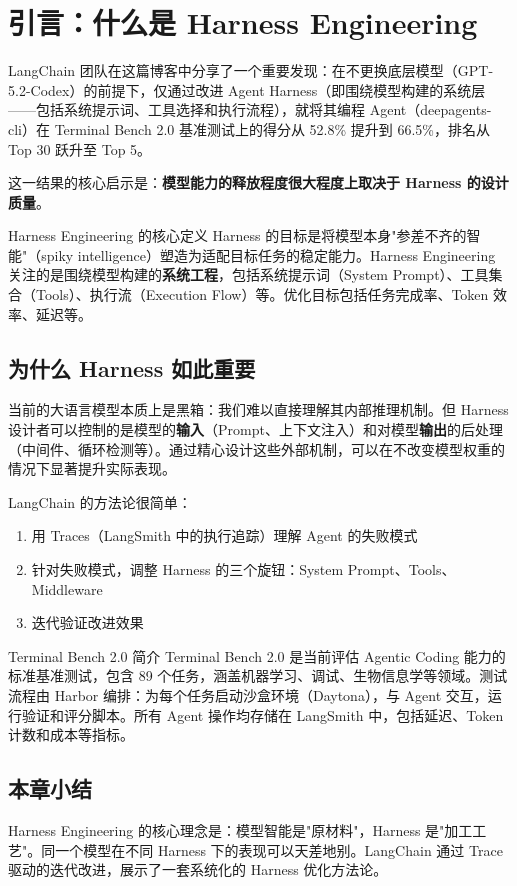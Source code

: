 \section{引言：什么是 Harness Engineering}

LangChain 团队在这篇博客中分享了一个重要发现：在不更换底层模型（GPT-5.2-Codex）的前提下，仅通过改进 Agent Harness（即围绕模型构建的系统层——包括系统提示词、工具选择和执行流程），就将其编程 Agent（deepagents-cli）在 Terminal Bench 2.0 基准测试上的得分从 52.8\% 提升到 66.5\%，排名从 Top 30 跃升至 Top 5。

这一结果的核心启示是：\textbf{模型能力的释放程度很大程度上取决于 Harness 的设计质量}。

\begin{importantbox}{Harness Engineering 的核心定义}
Harness 的目标是将模型本身"参差不齐的智能"（spiky intelligence）塑造为适配目标任务的稳定能力。Harness Engineering 关注的是围绕模型构建的\textbf{系统工程}，包括系统提示词（System Prompt）、工具集合（Tools）、执行流（Execution Flow）等。优化目标包括任务完成率、Token 效率、延迟等。
\end{importantbox}

\subsection{为什么 Harness 如此重要}

当前的大语言模型本质上是黑箱：我们难以直接理解其内部推理机制。但 Harness 设计者可以控制的是模型的\textbf{输入}（Prompt、上下文注入）和对模型\textbf{输出}的后处理（中间件、循环检测等）。通过精心设计这些外部机制，可以在不改变模型权重的情况下显著提升实际表现。

LangChain 的方法论很简单：
\begin{enumerate}[leftmargin=2em]
    \item 用 Traces（LangSmith 中的执行追踪）理解 Agent 的失败模式
    \item 针对失败模式，调整 Harness 的三个旋钮：System Prompt、Tools、Middleware
    \item 迭代验证改进效果
\end{enumerate}

\begin{knowledgebox}{Terminal Bench 2.0 简介}
Terminal Bench 2.0 是当前评估 Agentic Coding 能力的标准基准测试，包含 89 个任务，涵盖机器学习、调试、生物信息学等领域。测试流程由 Harbor 编排：为每个任务启动沙盒环境（Daytona），与 Agent 交互，运行验证和评分脚本。所有 Agent 操作均存储在 LangSmith 中，包括延迟、Token 计数和成本等指标。
\end{knowledgebox}

\subsection{本章小结}

Harness Engineering 的核心理念是：模型智能是"原材料"，Harness 是"加工工艺"。同一个模型在不同 Harness 下的表现可以天差地别。LangChain 通过 Trace 驱动的迭代改进，展示了一套系统化的 Harness 优化方法论。


